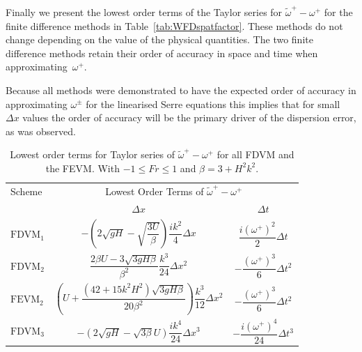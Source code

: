 Finally we present the lowest order terms of the Taylor series for ${\widetilde{\omega}^+-\omega^+}$ for the finite difference methods in Table~\ref{tab:WFDspatfactor}. These methods do not change depending on the value of the physical quantities. The two finite difference methods retain their order of accuracy in space and time when approximating~$\omega^+$.

Because all methods were demonstrated to have the expected order of accuracy in approximating $\omega^\pm$ for the linearised Serre equations this implies that for small $\Delta x$ values the order of accuracy will be the primary driver of the dispersion error, as was observed.

\begin{table}
	\centering
	\begin{tabular}{l  c  c}
	\hline
		Scheme & \multicolumn{2}{c}{Lowest Order Terms of $\widetilde{\omega}^+-\omega^+$}\T\B \\
		\cline{2-3}
		& $\Delta x$&$\Delta t$\T\B \\
		\hline
		$\text{FDVM}_1$& $-\left(2 \sqrt{gH} - \sqrt{\dfrac{3U}{\beta }}\right)  \dfrac{ik^2}{4} \Delta x$ & $\dfrac{i \left(\omega^+\right)^2}{2} \Delta t$ \T\B \\
		$\text{FDVM}_2$& $\dfrac{2\beta U -3 \sqrt{3 gH \beta}}{\beta^2}  \dfrac{k^3}{24}\Delta x ^2$ & $- \dfrac{\left(\omega^+\right)^3}{6 }  \Delta t^2$ \T\B \\
		$\text{FEVM}_2$& $\left(U   + \dfrac{\left(42 + 15 k^2H^2\right) \sqrt{3gH \beta}}{20\beta^2}  \right) \dfrac{k^3}{12 } \Delta x^2$ &  $- \dfrac{\left(\omega^+\right)^3}{6 }  \Delta t^2$ \T\B \\
		$\text{FDVM}_3$& $-\left({2\sqrt{gH} - \sqrt{3\beta}U }\right) \dfrac{ik^4}{24} \Delta x^3$ & $-\dfrac{i\left(\omega^+\right)^4}{24 } \Delta t^3$ \T\B  \\ \hline
	\end{tabular}
	\caption{Lowest order terms for Taylor series of $\widetilde{\omega}^+-\omega^+$ for all FDVM and the FEVM. With $  -1 \le Fr \le 1$ and $\beta = 3 + H^2 k^2 $. }
	\label{tab:Wfactor} 
\end{table}

